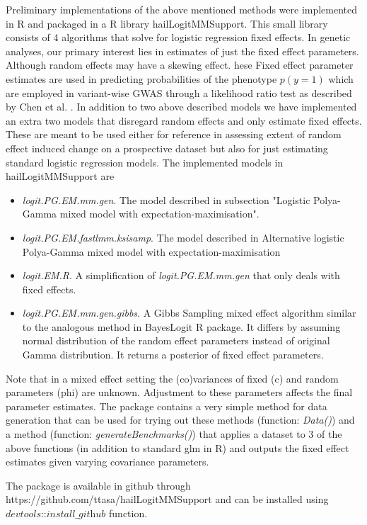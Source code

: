 \documentclass [12pt,a4paper]{report}
\begin{document}
Preliminary implementations of the above mentioned methods were implemented in R and packaged in a R library  hailLogitMMSupport. This small library consists of 4 algorithms that solve for logistic regression fixed effects. In genetic analyses, our primary interest lies in estimates of just the fixed effect parameters. Although random effects may have a skewing effect. hese Fixed effect parameter estimates are used in predicting probabilities of the phenotype $p(y=1)$ which are employed in variant-wise GWAS through a likelihood ratio test as described by Chen et al. \cite{chen_control_2016}. In addition to two above described models we have implemented an extra two models that disregard random effects and only estimate fixed effects. These are meant to be used either for reference in assessing extent of random effect induced change on a prospective dataset but also for just estimating standard logistic regression models.
The implemented models in hailLogitMMSupport are
\begin{itemize}
 \item \textit{logit.PG.EM.mm.gen}. The model described in subsection "Logistic Polya-Gamma mixed model with expectation-maximisation".
 \item \textit{logit.PG.EM.fastlmm.ksisamp}. The model described in  Alternative logistic Polya-Gamma mixed model with expectation-maximisation
 \item \textit{logit.EM.R}. A simplification of \textit{logit.PG.EM.mm.gen} that only deals with fixed effects.
 \item \textit{logit.PG.EM.mm.gen.gibbs}. A Gibbs Sampling mixed effect algorithm similar to the analogous method in BayesLogit R package. It differs by assuming normal distribution of the random effect parameters instead of original Gamma distribution. It returns a posterior of fixed effect parameters.      
\end{itemize}

Note that in a mixed effect setting the (co)variances of fixed (c) and random parameters (phi) are unknown. Adjustment to these parameters affects the final parameter estimates. The package contains a very simple method for data generation that can be used for trying out these methods (function: \textit{Data()}) and a method (function: \textit{generateBenchmarks()}) that applies a dataset to 3 of the above functions (in addition to standard glm in R) and outputs the fixed effect estimates given varying covariance parameters.\par 
The package is available in github through https://github.com/ttasa/hailLogitMMSupport and can be installed using $\textit{devtools::install\_github}$ function.



\end{document}
